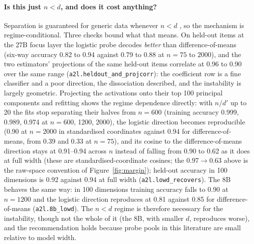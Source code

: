 \documentclass[11pt]{article}
\newcommand{\rid}[1]{{\footnotesize\texttt{#1}}}
\begin{document}
\paragraph{Is this just $n<d$, and does it cost anything?} Separation is guaranteed for generic data whenever $n<d$ \citep{cover1965geometrical,candes2020phase}, so the mechanism is regime-conditional. Three checks bound what that means. On held-out items at the 27B focus layer the logistic probe decodes \emph{better} than difference-of-means (six-way accuracy 0.82 to 0.94 against 0.79 to 0.88 at $n=75$ to $2000$), and the two estimators' projections of the same held-out items correlate at 0.96 to 0.90 over the same range (\rid{a2l.heldout\_and\_projcorr}): the coefficient row is a fine classifier and a poor direction, the dissociation \citet{marks2023geometry} described, and the instability is largely geometric. Projecting the activations onto their top 100 principal components and refitting shows the regime dependence directly: with $n/d'$ up to 20 the fits stop separating their halves from $n=600$ (training accuracy 0.999, 0.989, 0.974 at $n = 600$, 1200, 2000), the logistic direction becomes reproducible (0.90 at $n=2000$ in standardised coordinates against 0.94 for difference-of-means, from 0.39 and 0.33 at $n=75$), and its cosine to the difference-of-means direction stays at 0.91--0.94 across $n$ instead of falling from 0.90 to 0.62 as it does at full width (these are standardised-coordinate cosines; the 0.97$\to$0.63 above is the raw-space convention of Figure~\ref{fig:margin}); held-out accuracy in 100 dimensions is 0.92 against 0.94 at full width (\rid{a2l.lowd\_recovers}). The 8B behaves the same way: in 100 dimensions training accuracy falls to 0.90 at $n=1200$ and the logistic direction reproduces at 0.81 against 0.85 for difference-of-means (\rid{a2l.8b\_lowd}). The $n<d$ regime is therefore necessary for the instability, though not the whole of it (the 8B, with smaller $d$, reproduces worse), and the recommendation holds because probe pools in this literature are small relative to model width.
\end{document}
